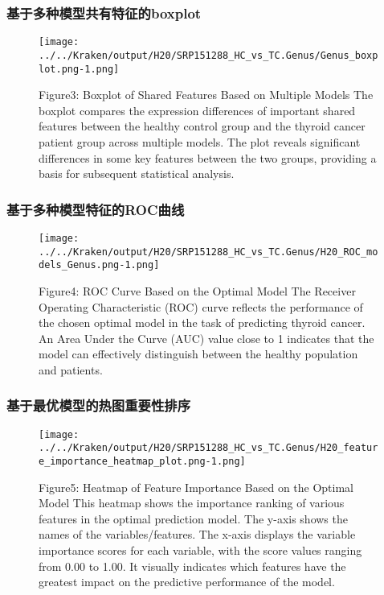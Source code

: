 \documentclass[
]{article}
\begin{document}
\subsubsection{基于多种模型共有特征的boxplot}\label{ux57faux4e8eux591aux79cdux6a21ux578bux5171ux6709ux7279ux5f81ux7684boxplot}

\begin{figure}
\centering
\texttt{[image: ../../Kraken/output/H20/SRP151288\_HC\_vs\_TC.Genus/Genus\_boxplot.png-1.png]}
\caption{Figure3: Boxplot of Shared Features Based on Multiple Models
The boxplot compares the expression differences of important shared
features between the healthy control group and the thyroid cancer
patient group across multiple models. The plot reveals significant
differences in some key features between the two groups, providing a
basis for subsequent statistical analysis.}
\end{figure}

\subsubsection{基于多种模型特征的ROC曲线}\label{ux57faux4e8eux591aux79cdux6a21ux578bux7279ux5f81ux7684rocux66f2ux7ebf}

\begin{figure}
\centering
\texttt{[image: ../../Kraken/output/H20/SRP151288\_HC\_vs\_TC.Genus/H20\_ROC\_models\_Genus.png-1.png]}
\caption{Figure4: ROC Curve Based on the Optimal Model The Receiver
Operating Characteristic (ROC) curve reflects the performance of the
chosen optimal model in the task of predicting thyroid cancer. An Area
Under the Curve (AUC) value close to 1 indicates that the model can
effectively distinguish between the healthy population and patients.}
\end{figure}

\subsubsection{基于最优模型的热图重要性排序}\label{ux57faux4e8eux6700ux4f18ux6a21ux578bux7684ux70edux56feux91cdux8981ux6027ux6392ux5e8f}

\begin{figure}
\centering
\texttt{[image: ../../Kraken/output/H20/SRP151288\_HC\_vs\_TC.Genus/H20\_feature\_importance\_heatmap\_plot.png-1.png]}
\caption{Figure5: Heatmap of Feature Importance Based on the Optimal
Model This heatmap shows the importance ranking of various features in
the optimal prediction model. The y-axis shows the names of the
variables/features. The x-axis displays the variable importance scores
for each variable, with the score values ranging from 0.00 to 1.00. It
visually indicates which features have the greatest impact on the
predictive performance of the model.}
\end{figure}
\end{document}
